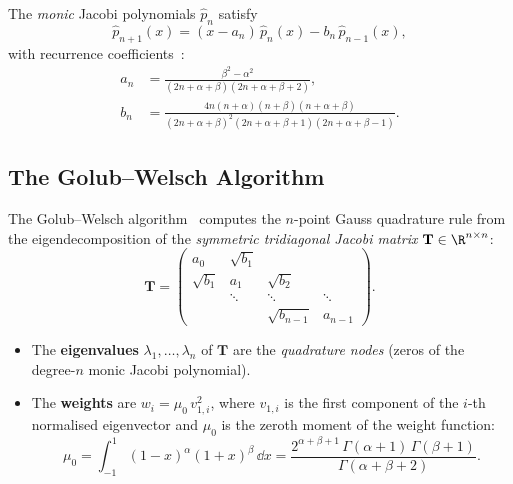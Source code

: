 The \emph{monic} Jacobi polynomials $\hat{p}_n$ satisfy
\[
  \hat{p}_{n+1}(x) = (x - a_n)\,\hat{p}_n(x) - b_n\,\hat{p}_{n-1}(x),
\]
with recurrence coefficients~\cite{Gautschi2004}:
\begin{align}
  a_n &= \frac{\beta^2 - \alpha^2}{(2n+\alpha+\beta)(2n+\alpha+\beta+2)},
  \label{eq:an_coeff} \\
  b_n &= \frac{4n(n+\alpha)(n+\beta)(n+\alpha+\beta)}
              {(2n+\alpha+\beta)^2(2n+\alpha+\beta+1)(2n+\alpha+\beta-1)}.
  \label{eq:bn_coeff}
\end{align}


\subsection{The Golub--Welsch Algorithm}
\label{sec:gw_algorithm}

The Golub--Welsch algorithm~\cite{GolubWelsch1969} computes the $n$-point
Gauss quadrature rule from the eigendecomposition of the \emph{symmetric
tridiagonal Jacobi matrix} $\mathbf{T} \in \R^{n \times n}$:
\begin{equation}
  \mathbf{T} = \begin{pmatrix}
    a_0       & \sqrt{b_1} &            &        \\
    \sqrt{b_1} & a_1       & \sqrt{b_2} &        \\
                & \ddots    & \ddots     & \ddots \\
                &           & \sqrt{b_{n-1}} & a_{n-1}
  \end{pmatrix}.
  \label{eq:jacobi_matrix}
\end{equation}

\begin{itemize}[nosep]
  \item The \textbf{eigenvalues} $\lambda_1, \dots, \lambda_n$ of
        $\mathbf{T}$ are the \emph{quadrature nodes} (zeros of the degree-$n$
        monic Jacobi polynomial).
  \item The \textbf{weights} are $w_i = \mu_0\, v_{1,i}^2$, where
        $v_{1,i}$ is the first component of the $i$-th normalised eigenvector
        and $\mu_0$ is the zeroth moment of the weight function:
        \begin{equation}
          \mu_0 = \int_{-1}^{1} (1-x)^\alpha (1+x)^\beta\,\dd x
               = \frac{2^{\alpha+\beta+1}\,\Gamma(\alpha+1)\,\Gamma(\beta+1)}
                      {\Gamma(\alpha+\beta+2)}.
          \label{eq:mu0}
        \end{equation}
\end{itemize}

